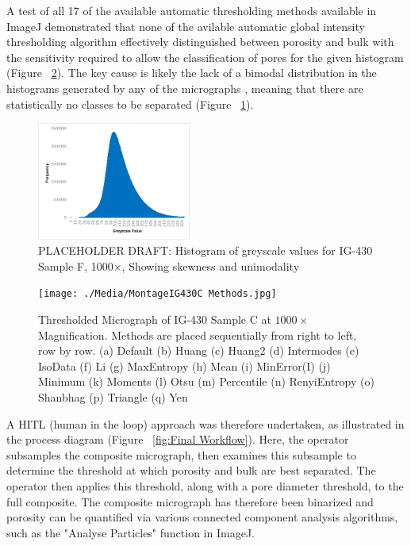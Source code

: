 \documentclass[3p,twocolumn]{elsarticle}
\begin{document}
A test of all 17 of the available automatic thresholding methods available in
ImageJ demonstrated that none of the avilable automatic global intensity
thresholding algorithm effectively distinguished between porosity and bulk
with the sensitivity required to allow the classification of pores for the
given histogram (Figure ~\ref{fig:Try All Thresholding Methods}). The key
cause is likely the lack of a bimodal distribution in the histograms generated
by any of the micrographs , meaning that there are statistically no classes to
be separated (Figure ~\ref{fig:histogramnobimodal}). 

    \begin{figure}
		\centering
    \includegraphics[width=0.45\textwidth]{./Media/IG430F Greyscale Histogram.png}
		\caption{PLACEHOLDER DRAFT: Histogram of greyscale values for IG-430 Sample F, 1000×, Showing skewness and unimodality}
		\label{fig:histogramnobimodal}
	\end{figure} 

	\begin{figure}[!htbp]
		\centering
		\texttt{[image: ./Media/MontageIG430C Methods.jpg]}
		\caption{Thresholded Micrograph of IG-430 Sample C at $1000\times$ Magnification. Methods are placed sequentially from right to left, row by row. 
    (a) Default
			(b) Huang
			(c) Huang2
			(d) Intermodes
			(e) IsoData
			(f) Li
			(g) MaxEntropy
			(h) Mean
			(i) MinError(I)
			(j) Minimum
			(k) Moments
			(l) Otsu
			(m) Percentile
			(n) RenyiEntropy
			(o) Shanbhag
			(p) Triangle
			(q) Yen}
		\label{fig:Try All Thresholding Methods}
	\end{figure}  

	A HITL (human in the loop) approach was therefore undertaken, as illustrated
	in the  process diagram (Figure ~\ref{fig:Final Workflow}). Here, the operator
	subsamples the composite micrograph, then examines this subsample to
	determine the threshold at which porosity and bulk are best separated. The
	operator then applies this threshold, along with a pore diameter threshold, to
	the full composite. The composite micrograph has therefore been binarized and 
  porosity can be quantified via various connected component analysis
  algorithms, such as the "Analyse Particles" function in ImageJ.
\end{document}
